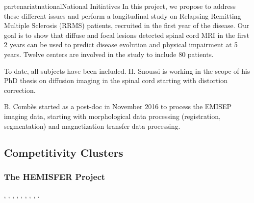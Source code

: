 \documentclass{ra2018}
\begin{document}
\begin{module}{partenariat}{national}{National Initiatives}
In this project, we propose to address these different issues and perform a
longitudinal study on Relapsing Remitting Multiple Sclerosis (RRMS) patients,
recruited in the first year of the disease. Our goal is to show that diffuse
and focal lesions detected spinal cord MRI in the first 2 years can be used to
predict disease evolution and physical impairment at 5 years. Twelve centers
are involved in the study to include 80 patients. 

To date, all subjects have been included. H. Snoussi is working in the
scope of his PhD thesis on diffusion imaging in the spinal cord starting with distortion correction. 

B. Combès started as a post-doc in November 2016 to process the EMISEP imaging data, starting with morphological data processing (registration, segmentation) and magnetization transfer data processing. 

        \subsection{Competitivity Clusters}
        
        \subsubsection{The HEMISFER Project}
        \begin{participants}
          , 
          ,
          , 
          ,
          ,
          , 
          , 
          ,
          .
        \end{participants}	
        

\end{module}
\end{document}
